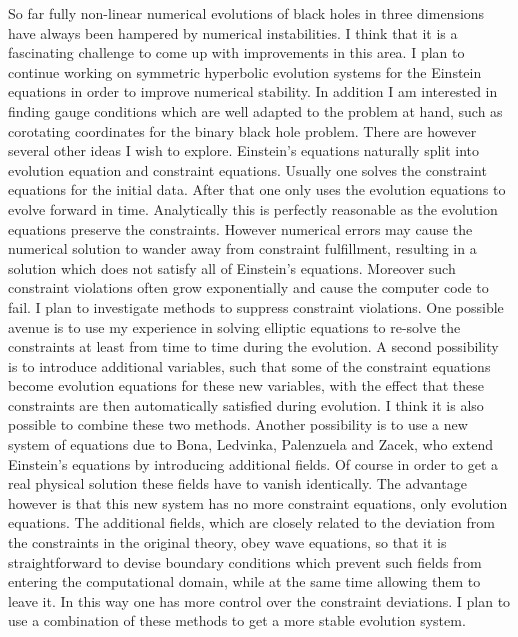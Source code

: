 \documentclass[11pt]{article}
\begin{document}
\begin{spacing}{0.95}
So far fully non-linear numerical evolutions of black holes in three
dimensions have always been hampered by numerical instabilities. I think
that it is a fascinating challenge to come up with improvements in this
area. I plan to continue working on symmetric hyperbolic evolution systems
for the Einstein equations in order to improve numerical stability.
In addition I am interested in finding gauge conditions which are well adapted
to the problem at hand, such as corotating coordinates for the binary black
hole problem. There are however several other ideas I wish to explore.
Einstein's equations naturally split into evolution equation and constraint
equations. Usually one solves the constraint equations for the initial data.
After that one only uses the evolution equations to evolve forward in time.
Analytically this is perfectly reasonable as the evolution equations
preserve the constraints. However numerical errors may cause the numerical
solution to wander away from constraint fulfillment, resulting in a solution
which does not satisfy all of Einstein's equations. Moreover such constraint
violations often grow exponentially and cause the computer code to fail. I
plan to investigate methods to suppress constraint violations. One possible
avenue is to use my experience in solving elliptic equations to re-solve the
constraints at least from time to time during the evolution. A second
possibility is to introduce additional variables, such that some of the
constraint equations become evolution equations for these new variables,
with the effect that these constraints are then automatically satisfied
during evolution. I think it is also possible to combine these two methods.
Another possibility is to use a new system of equations due to Bona,
Ledvinka, Palenzuela and Zacek, who extend Einstein's equations by
introducing additional fields. Of course in order to get a real physical
solution these fields have to vanish identically. The advantage however is
that this new system has no more constraint equations, only evolution
equations. The additional fields, which are closely related to the deviation
from the constraints in the original theory, obey wave equations, so that it
is straightforward to devise boundary conditions which prevent such fields
from entering the computational domain, while at the same time allowing them
to leave it. In this way one has more control over the constraint
deviations. I plan to use a combination of these methods to get a more
stable evolution system.


\end{spacing}
\end{document}
